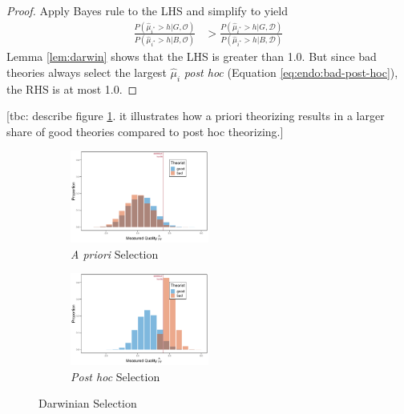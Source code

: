 \documentclass[12pt,english]{article}
\theoremstyle{plain}
\theoremstyle{plain}
\begin{document}
\begin{proof}
Apply Bayes rule to the LHS and simplify to yield
\begin{align*}
\frac{P\left(\hat{\mu}_{i^{\ast}}>h|G,\mathcal{O}\right)}{P\left(\hat{\mu}_{i^{\ast}}>h|B,\mathcal{O}\right)} & >\frac{P\left(\hat{\mu}_{i^{\ast}}>h|G,\mathcal{\mathcal{D}}\right)}{P\left(\hat{\mu}_{i^{\ast}}>h|B,\mathcal{\mathcal{D}}\right)}
\end{align*}
Lemma \ref{lem:darwin} shows that the LHS is greater than 1.0. But since bad theories always select the largest
$\hat{\mu}_{i}$ \emph{post hoc} (Equation \eqref{eq:endo:bad-post-hoc}), the RHS is at most 1.0. 
\end{proof}

[tbc: describe figure \ref{fig:darwinian_selection}. it illustrates how a priori theorizing results in a larger share of good theories compared to post hoc theorizing.]


\begin{figure}[t]
    \centering
    \begin{subfigure}[b]{\textwidth}
        \centering
        \caption{\emph{A priori} Selection}
        \includegraphics[width=0.5\textwidth]{../Results/litplus-muhat-ap.pdf}
    \end{subfigure}
    
    \vspace{1em}
    
    \begin{subfigure}[b]{\textwidth}
        \centering
        \caption{\emph{Post hoc} Selection}
        \includegraphics[width=0.5\textwidth]{../Results/litplus-muhat-ph.pdf}
    \end{subfigure}
    \caption{Darwinian Selection}
    \label{fig:darwinian_selection}
\end{figure}
\end{document}

